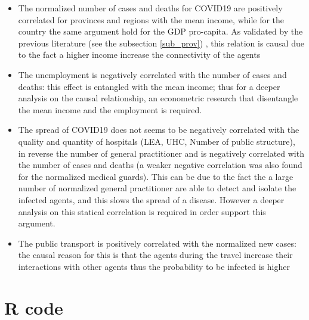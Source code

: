 \documentclass[
12pt, %
a4paper, %
oneside, %
headinclude,footinclude, %
BCOR5mm, %
]{scrartcl}
\begin{document}
\begin{itemize}
\item The normalized number of cases and deaths for COVID19 are positively correlated for provinces and regions with the mean income, while for the country the same argument hold for the GDP pro-capita. As validated by the previous literature (see the subsection \ref{sub_prov}) , this relation is causal due to the fact a higher income increase the connectivity of the agents
\item The unemployment is negatively correlated with the number of cases and deaths: this effect is entangled with the mean income; thus for a deeper analysis on the causal relationship, an econometric research that disentangle the mean income and the employment is required. 
\item The spread of COVID19 does not seems to be negatively correlated with the quality and quantity of hospitals (LEA, UHC, Number of public structure), in reverse the number of general practitioner and is negatively correlated with the number of cases and deaths (a weaker negative correlation was also found for the normalized medical guards). This can be due to the fact the a large number of normalized general practitioner are able to detect and isolate the infected agents, and this slows the spread of a disease. However a deeper analysis on this statical correlation is required in order support this argument. 
\item The public transport is positively correlated with the normalized new cases: the causal reason for this is that the agents during the travel increase their interactions with other agents thus the probability to be infected is higher
\end{itemize}

\section{R code}





\renewcommand{\refname}{\spacedlowsmallcaps{References}} %




\end{document}
